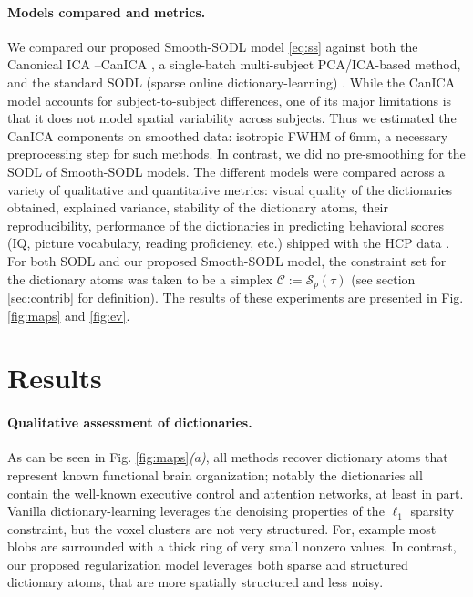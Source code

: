 \paragraph*{Models compared and metrics.} We compared our proposed Smooth-SODL model \eqref{eq:ss} against both the Canonical ICA --CanICA   \citep{varoquaux2010group}, a single-batch multi-subject PCA/ICA-based method, and the standard SODL (sparse online dictionary-learning)   \citep{mairal2010}. While the CanICA model accounts for subject-to-subject differences, one of
its major limitations is that it does not model spatial variability across
 subjects. Thus we estimated the CanICA components on smoothed data: isotropic FWHM of 6mm, a necessary preprocessing step for such methods. In contrast, we did no pre-smoothing for the SODL of Smooth-SODL models.
The different models were compared across a variety of qualitative and quantitative metrics: visual quality of the dictionaries obtained, explained variance, stability of the dictionary atoms, their reproducibility, performance of the dictionaries in predicting behavioral scores (IQ, picture vocabulary, reading proficiency, etc.) shipped with the HCP data   \citep{VanEssen20122222}. For both SODL  \citep{mairal2010} and our proposed Smooth-SODL model, the constraint set for the dictionary atoms was taken to be a simplex $\mathcal C := \mathcal S_p(\tau)$ (see section \ref{sec:contrib} for definition). The results of these experiments are presented in Fig. \ref{fig:maps}
and \ref{fig:ev}.

\section{Results}
\label{sec:results}
\paragraph{Qualitative assessment of dictionaries.}
As can be seen in Fig. \ref{fig:maps}\textit{(a)}, all methods recover
dictionary atoms that represent known functional brain organization;
notably the dictionaries all
contain the well-known executive control and attention networks, at least
in part. Vanilla dictionary-learning leverages the denoising properties
of the $\ell_1$ sparsity constraint, but the voxel clusters are not very structured. For, example most blobs are surrounded with a thick ring of very small nonzero values.  In contrast, our proposed regularization model leverages both sparse and structured dictionary atoms, that are more spatially structured and less noisy.


